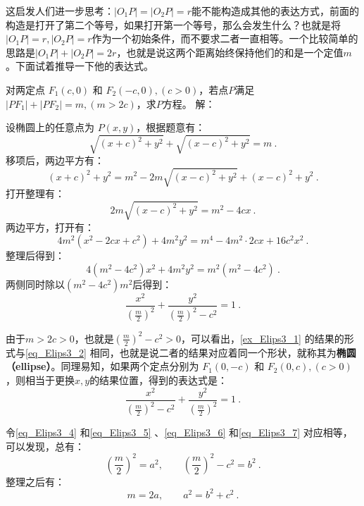 这启发人们进一步思考：$|O_1P|=|O_2P|=r$能不能构造成其他的表达方式，前面的构造是打开了第二个等号，如果打开第一个等号，那么会发生什么？也就是将$|O_1P|=r,|O_2P|=r$作为一个初始条件，而不要求二者一直相等。一个比较简单的思路是$|O_1P|+|O_2P|=2r$，也就是说这两个距离始终保持他们的和是一个定值$m$。下面试着推导一下他的表达式。

\begin{example}{对两定点 $F_1(c, 0)$ 和 $F_2(-c, 0),(c>0)$，若点$P$满足$|PF_1| + |PF_2| = m,(m > 2c)$，求$P$方程。}\label{ex_Elips3_1}
解：

设椭圆上的任意点为 $P(x, y)$，根据题意有：
\begin{equation}
\sqrt{(x + c)^2 + y^2} + \sqrt{(x - c)^2 + y^2} = m~.
\end{equation}
移项后，两边平方有：
\begin{equation}
(x + c)^2 + y^2 = m^2 - 2m\sqrt{(x - c)^2 + y^2} + (x - c)^2 + y^2~.
\end{equation}
打开整理有：
\begin{equation}
2m\sqrt{(x - c)^2 + y^2}= m^2 - 4cx~.
\end{equation}
两边平方，打开有：
\begin{equation}
4m^2(x^2 - 2cx+c^2) + 4m^2y^2= m^4-4m^2\cdot2cx+16c^2x^2~.
\end{equation}
整理后得到：
\begin{equation}
4(m^2 -4c^2)x^2 + 4m^2y^2= m^2(m^2-4c^2)~.
\end{equation}
两侧同时除以$(m^2-4c^2)m^2$后得到：
\begin{equation}\label{eq_Elips3_4}
\frac{x^2}{\left(\displaystyle\frac{m}{2}\right)^2} + \frac{y^2}{\displaystyle\left(\frac{m}{2}\right)^2-c^2}=1~.
\end{equation}
\end{example}

由于$m>2c>0$，也就是$\displaystyle\left(\frac{m}{2}\right)^2-c^2>0$，可以看出，\autoref{ex_Elips3_1} 的结果的形式与\autoref{eq_Elips3_2} 相同，也就是说二者的结果对应着同一个形状，就称其为\textbf{椭圆（ellipse）}。同理易知，如果两个定点分别为 $F_1(0,-c)$ 和 $F_2(0,c),(c>0)$，则相当于更换$x,y$的结果位置，得到的表达式是：
\begin{equation}\label{eq_Elips3_6}
\frac{x^2}{\displaystyle\left(\frac{m}{2}\right)^2-c^2}+\frac{y^2}{\left(\displaystyle\frac{m}{2}\right)^2} =1~.
\end{equation}

令\autoref{eq_Elips3_4} 和\autoref{eq_Elips3_5} 、\autoref{eq_Elips3_6} 和\autoref{eq_Elips3_7} 对应相等，可以发现，总有：
\begin{equation}
\left(\frac{m}{2}\right)^2=a^2,\qquad
\left(\frac{m}{2}\right)^2-c^2=b^2~.
\end{equation}
整理之后有：
\begin{equation}\label{eq_Elips3_8}
m=2a,\qquad
a^2=b^2+c^2~.
\end{equation}

